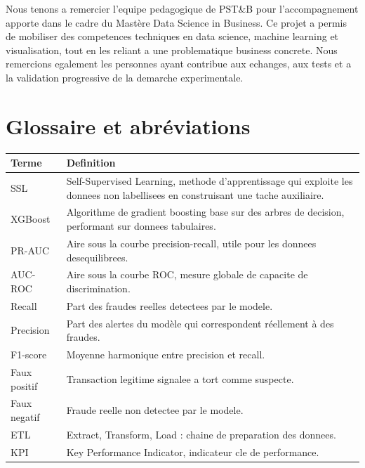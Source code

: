 ﻿\documentclass[12pt,a4paper,oneside]{report}
\begin{document}
Nous tenons a remercier l'equipe pedagogique de PST\&B pour l'accompagnement apporte dans le cadre du Mast\`ere Data Science in Business. Ce projet a permis de mobiliser des competences techniques en data science, machine learning et visualisation, tout en les reliant a une problematique business concrete. Nous remercions egalement les personnes ayant contribue aux echanges, aux tests et a la validation progressive de la demarche experimentale.

\tableofcontents
\listoffigures
{}
\listoftables
{}

\chapter*{Glossaire et abréviations}

\begin{longtable}{p{3cm}p{11cm}}
\toprule
\textbf{Terme} & \textbf{Definition} \\
\midrule
SSL & Self-Supervised Learning, methode d'apprentissage qui exploite les donnees non labellisees en construisant une tache auxiliaire. \\
XGBoost & Algorithme de gradient boosting base sur des arbres de decision, performant sur donnees tabulaires. \\
PR-AUC & Aire sous la courbe precision-recall, utile pour les donnees desequilibrees. \\
AUC-ROC & Aire sous la courbe ROC, mesure globale de capacite de discrimination. \\
Recall & Part des fraudes reelles detectees par le modele. \\
Precision & Part des alertes du modèle qui correspondent réellement à des fraudes. \\
F1-score & Moyenne harmonique entre precision et recall. \\
Faux positif & Transaction legitime signalee a tort comme suspecte. \\
Faux negatif & Fraude reelle non detectee par le modele. \\
ETL & Extract, Transform, Load : chaine de preparation des donnees. \\
KPI & Key Performance Indicator, indicateur cle de performance. \\
\bottomrule
\end{longtable}

\clearpage
{}
\setcounter{page}{1}
\pagestyle{fancy}
\end{document}
